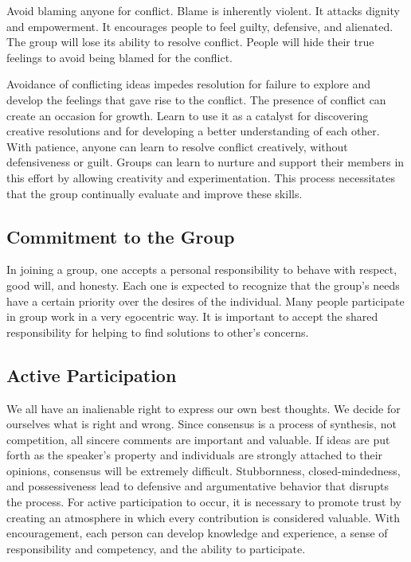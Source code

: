 Avoid blaming anyone for conflict. Blame is inherently violent. It attacks dignity and empowerment. It encourages people to feel guilty, defensive, and alienated. The group will lose its ability to resolve conflict. People will hide their true feelings to avoid being blamed for the conflict.

Avoidance of conflicting ideas impedes resolution for failure to explore and develop the feelings that gave rise to the conflict. The presence of conflict can create an occasion for growth. Learn to use it as a catalyst for discovering creative resolutions and for developing a better understanding of each other. With patience, anyone can learn to resolve conflict creatively, without defensiveness or guilt. Groups can learn to nurture and support their members in this effort by allowing creativity and experimentation. This process necessitates that the group continually evaluate and improve these skills.

\subsection*{Commitment to the Group}

In joining a group, one accepts a personal responsibility to behave with respect, good will, and honesty. Each one is expected to recognize that the group's needs have a certain priority over the desires of the individual. Many people participate in group work in a very egocentric way. It is important to accept the shared responsibility for helping to find solutions to other's concerns.

\subsection*{Active Participation}
We all have an inalienable right to express our own best thoughts. We decide for ourselves what is right and wrong. Since consensus is a process of synthesis, not competition, all sincere comments are important and valuable. If ideas are put forth as the speaker's property and individuals are strongly attached to their opinions, consensus will be extremely difficult. Stubbornness, closed-mindedness, and possessiveness lead to defensive and argumentative behavior that disrupts the process. For active participation to occur, it is necessary to promote trust by creating an atmosphere in which every contribution is considered valuable. With encouragement, each person can develop knowledge and experience, a sense of responsibility and competency, and the ability to participate.

